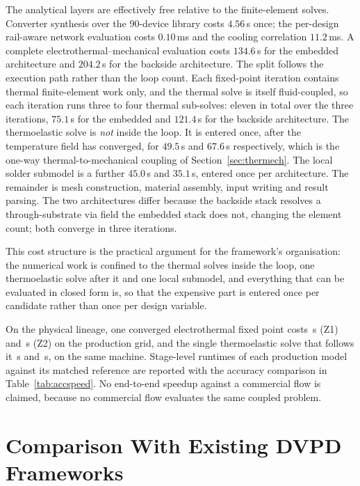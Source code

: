 \documentclass[journal]{IEEEtran}
\begin{document}
The analytical layers are effectively free relative to the finite-element solves. Converter
synthesis over the 90-device library costs $4.56$\,s once; the per-design rail-aware network
evaluation costs $0.10$\,ms and the cooling correlation $11.2$\,ms. A complete
electrothermal--mechanical evaluation costs $134.6$\,s for the embedded architecture and
$204.2$\,s for the backside architecture. The split follows the execution path rather than
the loop count. Each fixed-point iteration contains thermal finite-element work only, and the
thermal solve is itself fluid-coupled, so each iteration runs three to four thermal
sub-solves: eleven in total over the three iterations, $75.1$\,s for the embedded and
$121.4$\,s for the backside architecture. The thermoelastic solve is \emph{not} inside the
loop. It is entered once, after the temperature field has converged, for $49.5$\,s and
$67.6$\,s respectively, which is the one-way thermal-to-mechanical coupling of
Section~\ref{sec:thermech}. The local solder submodel is a further $45.0$\,s and $35.1$\,s,
entered once per architecture. The remainder is mesh construction, material assembly, input
writing and result parsing. The two architectures differ because the backside stack resolves
a through-substrate via field the embedded stack does not, changing the element count; both
converge in three iterations.

This cost structure is the practical argument for the framework's organisation: the numerical
work is confined to the thermal solves inside the loop, one thermoelastic solve after it and
one local submodel, and everything that can be evaluated in closed form is, so that the
expensive part is entered once per candidate rather than once per design variable.

On the physical lineage, one converged electrothermal fixed point costs \EtWallZone\,s (Z1)
and \EtWallZtwo\,s (Z2) on the production grid, and the single thermoelastic solve that
follows it \MechWallZone\,s and \MechWallZtwo\,s, on the same machine. Stage-level runtimes
of each production model against its matched reference are reported with the accuracy
comparison in Table~\ref{tab:accspeed}. No end-to-end speedup against a commercial flow is
claimed, because no commercial flow evaluates the same coupled problem.

\section{Comparison With Existing DVPD Frameworks}\label{sec:compare}
\end{document}

